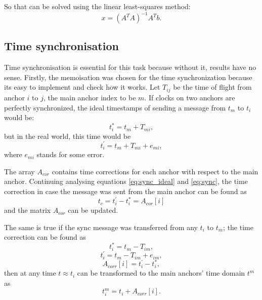 \documentclass[journal]{IEEEtran}
\begin{document}
So that can be solved using the linear least-squares method:
\begin{equation}
    x = (A^{T}A)^{-1}A^{T}b.
\end{equation}

\subsection{Time synchronisation}
\label{sec:time_sync}

Time synchronisation is essential for this task because without it, results have no sense.
Firstly, the memoisation was chosen for the time synchronization because its easy to implement and check how it works.
Let $T_{ij}$ be the time of flight from anchor $i$ to $j$, the main anchor index to be $m$.
If clocks on two anchors are perfectly synchronized, the ideal timestamps of sending a message from $t_m$ to $t_i$ would be:
\begin{equation}
    \label{eq:sync_ideal}
    t_{i}^* = t_m + T_{mi},
\end{equation}
but in the real world, this time would be
\begin{equation}
    \label{eq:sync}
    t_{i}^{'} = t_m + T_{mi} + e_{mi},
\end{equation}
where $e_{mi}$ stands for some error.

The array $A_{cor}$ contains time corrections for each anchor with respect to the main anchor. 
Continuing analysing equations \eqref{eq:sync_ideal} and \eqref{eq:sync}, the time correction in case the message was sent from the main anchor can be found as
\begin{equation}
    t_{c} = t_i^{'} - t_i^{*} = A_{cor}[i]
\end{equation}
and the matrix $A_{cor}$ can be updated.

The same is true if the sync message was transferred from any $t_i$ to $t_m$; the time correction can be found as
\begin{equation}
    t_i^{*} = t_m - T_{im},
\end{equation}
\begin{equation}
    t_i^{'} = t_m - T_{im} + e_{im},
\end{equation}
\begin{equation}
    A_{corr}[i] = t_i^{'} - t_i^{*},
\end{equation}
then at any time $t \approx t_i$ can be transformed to the main anchors' time domain $t^m$ as
\begin{equation}
    t_i^{m} = t_i + A_{corr}[i].
\end{equation}
\end{document}
